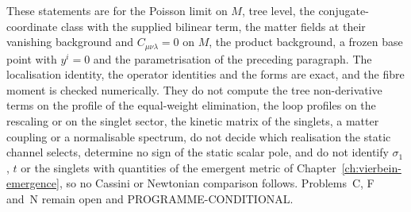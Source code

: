 These statements are for the Poisson limit on \(M\), tree level, the conjugate-coordinate class with the supplied bilinear term, the matter fields at their vanishing background and \(C_{\mu\nu\lambda}=0\) on \(M\), the product background, a frozen base point with \(y^i=0\) and the parametrisation of the preceding paragraph. The localisation identity, the operator identities and the forms are exact, and the fibre moment is checked numerically. They do not compute the tree non-derivative terms on the profile of the equal-weight elimination, the loop profiles on the rescaling or on the singlet sector, the kinetic matrix of the singlets, a matter coupling or a normalisable spectrum, do not decide which realisation the static channel selects, determine no sign of the static scalar pole, and do not identify \(\sigma_1\), \(t\) or the singlets with quantities of the emergent metric of Chapter~\ref{ch:vierbein-emergence}, so no Cassini or Newtonian comparison follows. Problems~C, F and~N remain open and PROGRAMME-CONDITIONAL.

